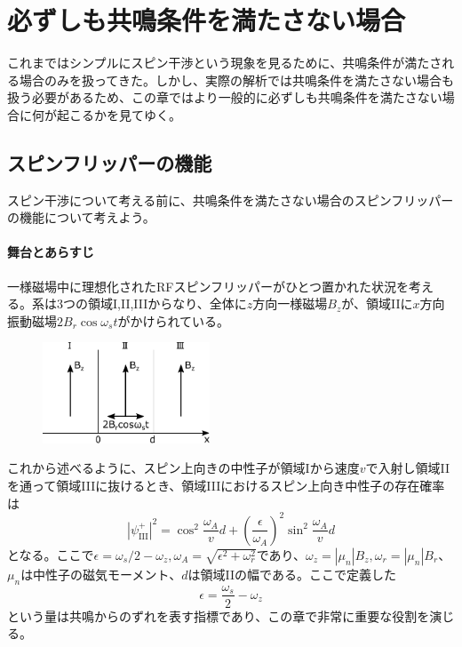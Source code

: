 \section{必ずしも共鳴条件を満たさない場合}\label{nonreso_sec}
これまではシンプルにスピン干渉という現象を見るために、共鳴条件が満たされる場合のみを扱ってきた。しかし、実際の解析では共鳴条件を満たさない場合も扱う必要があるため、この章ではより一般的に必ずしも共鳴条件を満たさない場合に何が起こるかを見てゆく。


\subsection{スピンフリッパーの機能}
スピン干渉について考える前に、共鳴条件を満たさない場合のスピンフリッパーの機能について考えよう。

\paragraph{舞台とあらすじ}
一様磁場中に理想化されたRFスピンフリッパーがひとつ置かれた状況を考える。系は3つの領域I,II,IIIからなり、全体に$z$方向一様磁場$B_z$が、領域IIに$x$方向振動磁場$2B_r \cos \omega_s t$がかけられている。
\begin{figure}[h]
\centering
\includegraphics[height=3cm]{nonreso/resonance_setting1.pdf}
\end{figure}

これから述べるように、スピン上向きの中性子が領域Iから速度$v$で入射し領域IIを通って領域IIIに抜けるとき、領域IIIにおけるスピン上向き中性子の存在確率は
\begin{equation}
|\psi_{\mathrm{III}}^+|^2=\cos^2 \frac{\omega_A}{v}d+\left(\frac{\epsilon}{\omega_A}\right)^2\sin^2\frac{\omega_A}{v}d \label{Nonreso_flip}
\end{equation}
となる。ここで$\epsilon=\omega_s/2-\omega_z,\omega_A=\sqrt{\epsilon^2+\omega_r^2}$であり、$\omega_z=|\mu_n|B_z,\omega_r=|\mu_n|B_r$、$\mu_n$は中性子の磁気モーメント、$d$は領域IIの幅である。ここで定義した
\begin{equation}
\epsilon=\frac{\omega_s}{2}-\omega_z
\end{equation}
という量は共鳴からのずれを表す指標であり、この章で非常に重要な役割を演じる。

